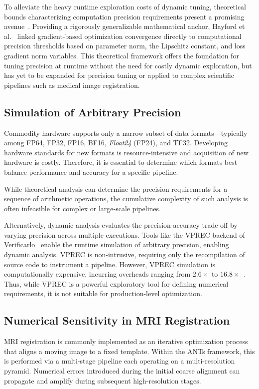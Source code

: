 \documentclass[journal,twoside,web]{ieeecolor}
\begin{document}
To alleviate the heavy runtime exploration costs of dynamic tuning, theoretical bounds characterizing computation precision requirements present a promising avenue~\cite{Sakr2017-ec, Tu2023-os, Wang2024-re}. Providing a rigorously generalizable mathematical anchor, Hayford et al.~\cite{Hayford2024-kb} linked gradient-based optimization convergence directly to computational precision thresholds based on parameter norm, the Lipschitz constant, and loss gradient norm variables. This theoretical framework offers the foundation for tuning precision at runtime without the need for costly dynamic exploration, but has yet to be expanded for precision tuning or applied to complex scientific pipelines such as medical image registration.

\subsection{Simulation of Arbitrary Precision}
Commodity hardware supports only a narrow subset of data formats---typically among FP64, FP32, FP16, BF16, \textit{Float24} (FP24), and TF32. Developing hardware standards for new formats is resource-intensive and acquisition of new hardware is costly. Therefore, it is essential to determine which formats best balance performance and accuracy for a specific pipeline.

While theoretical analysis can determine the precision requirements for a sequence of arithmetic operations, the cumulative complexity of such analysis is often infeasible for complex or large-scale pipelines.

Alternatively, dynamic analysis evaluates the precision-accuracy trade-off by varying precision across multiple executions. Tools like the VPREC backend of Verificarlo~\cite{Denis2015-zf,Chatelain2019-vw} enable the runtime simulation of arbitrary precision, enabling dynamic analysis. VPREC is non-intrusive, requiring only the recompilation of source code to instrument a pipeline. However, VPREC simulation is computationally expensive, incurring overheads ranging from $2.6\times$ to $16.8\times$~\cite{Chatelain2019-vw}. Thus, while VPREC is a powerful exploratory tool for defining numerical requirements, it is not suitable for production-level optimization.

\subsection{Numerical Sensitivity in MRI Registration}
MRI registration is commonly implemented as an iterative optimization process
that aligns a moving image to a fixed template. Within the ANTs framework, this
is performed via a multi-stage pipeline each operating on a multi-resolution
pyramid. Numerical errors introduced during the initial coarse alignment can
propagate and amplify during subsequent high-resolution stages.
\end{document}
